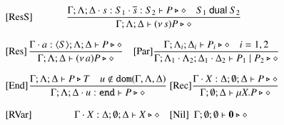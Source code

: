 \begin{figure}[t]
\[\begin{array}{lc}
		\trule{ResS}&\hspace{-0.5cm} \tree{
			\Gamma; \Lambda; \Delta \cat s:S_1 \cat \dual{s}: S_2 \proves P \hastype \Proc \quad S_1 \dualof S_2
		}{
			\Gamma; \Lambda; \Delta \proves \news{s} P \hastype \Proc
		}
		\\[6mm]
		\trule{Res}&\hspace{-0.5cm}\tree{
			\Gamma\cat a:\chtype{S} ; \Lambda; \Delta \proves P \hastype \Proc
		}{
			\Gamma; \Lambda; \Delta \proves \news{a} P \hastype \Proc}\quad 
		\trule{Par} \tree{
			\Gamma; \Lambda_{i}; \Delta_{i} \proves P_{i} \hastype \Proc \quad i=1,2
		}{
			\Gamma; \Lambda_{1} \cat \Lambda_2; \Delta_{1} \cat \Delta_2 \proves P_1 \Par P_2 \hastype \Proc
		}
\\[6mm]
		\trule{End}& \hspace{-0.5cm}\tree{
			\Gamma; \Lambda; \Delta  \proves P \hastype T \quad u \not\in \dom{\Gamma, \Lambda,\Delta}
		}{
			\Gamma; \Lambda; \Delta \cat u: \tinact  \proves P \hastype \Proc
		}
\ 
	 	\trule{Rec} \tree{
			\Gamma \cat \rvar{X}: \Delta; \emptyset; \Delta  \proves P \hastype \Proc
		}{
			\Gamma ; \emptyset; \Delta  \proves \recp{X}{P} \hastype \Proc
		}
		\\[6mm]
\trule{RVar}& \Gamma \cat \rvar{X}: \Delta; \emptyset; \Delta  \proves \rvar{X} \hastype \Proc
\quad 
		\trule{Nil}~~\Gamma; \emptyset; \emptyset \proves \inact \hastype \Proc
\\[4mm]
%

\end{array}\]
\end{figure}
